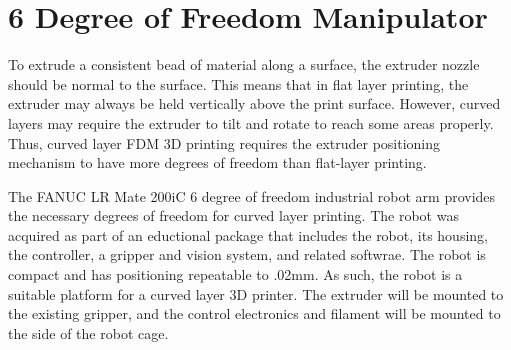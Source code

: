 \section{6 Degree of Freedom Manipulator}

To extrude a consistent bead of material along a surface, the extruder nozzle should be normal to the surface. This means that in flat layer printing, the extruder may always be held vertically above the print surface. However, curved layers may require the extruder to tilt and rotate to reach some areas properly. Thus, curved layer FDM 3D printing requires the extruder positioning mechanism to have more degrees of freedom than flat-layer printing. 

The FANUC LR Mate 200iC 6 degree of freedom industrial robot arm provides the necessary degrees of freedom for curved layer printing. The robot was acquired as part of an eductional package that includes the robot, its housing, the controller, a gripper and vision system, and related softwrae. The robot is compact and has positioning repeatable to .02mm. As such, the robot is a suitable platform for a curved layer 3D printer. The extruder will be mounted to the existing gripper, and the control electronics and filament will be mounted to the side of the robot cage.
